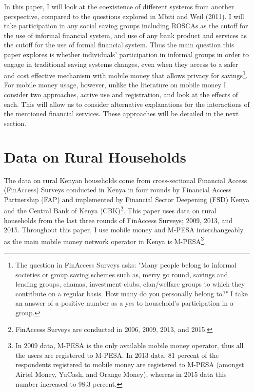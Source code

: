 \documentclass[11pt]{article}
\numberwithin{equation}{section}
\begin{document}
In this paper, I will look at the coexistence of different systems from another perspective, compared to the questions explored in Mbiti and Weil (2011). I will take participation in any social saving groups including ROSCAs as the cutoff for the use of informal financial system, and use of any bank product and services as the cutoff for the use of formal financial system. Thus the main question this paper explores is whether individuals' participation in informal groups in order to engage in traditional saving systems changes, even when they access to a safer and cost effective mechanism with mobile money that allows privacy for savings\footnote{The question in FinAccess Surveys asks: "Many people belong to informal societies or group saving schemes such as, merry go round, savings and lending groups, chamas, investment clubs, clan/welfare groups to which they contribute on a regular basis.  How many do you personally belong to?" I take an answer of a positive number as a yes to household's participation in a group.}. For mobile money usage, however, unlike the literature on mobile money I consider two approaches, active use and registration, and look at the effects of each. This will allow us to consider alternative explanations for the interactions of the mentioned financial services. These approaches will be detailed in the next section. 

\section{Data on Rural Households}

The data on rural Kenyan households come from cross-sectional Financial Access (FinAccess) Surveys conducted in Kenya in four rounds by Financial Access Partnership (FAP) and implemented by Financial Sector Deepening (FSD) Kenya and the Central Bank of Kenya (CBK)\footnote{ FinAccess Surveys are conducted in 2006, 2009, 2013, and 2015.}. This paper uses data on rural households from the last three rounds of FinAccess Surveys; 2009, 2013, and 2015. Throughout this paper, I use mobile money and M-PESA interchangeably as the main mobile money network operator in Kenya is M-PESA\footnote{In 2009 data, M-PESA is the only available mobile money operator, thus all the users are registered to M-PESA. In 2013 data, 81 percent of the respondents registered to mobile money are registered to M-PESA (amongst Airtel Money, YuCash, and Orange Money), whereas in 2015 data this number increased to 98.3 percent.}.
\end{document}
